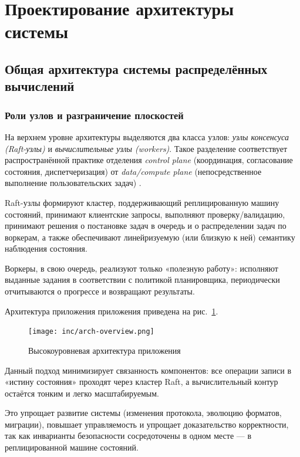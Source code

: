 \section{Проектирование архитектуры системы}

\subsection{Общая архитектура системы распределённых вычислений}

\subsubsection{Роли узлов и разграничение плоскостей}

На верхнем уровне архитектуры выделяются два класса узлов: \emph{узлы
консенсуса (Raft-узлы)} и \emph{вычислительные узлы (workers)}. Такое
разделение соответствует распространённой практике отделения \emph{control
plane} (координация, согласование состояния, диспетчеризация) от
\emph{data/compute plane} (непосредственное выполнение пользовательских задач)
\cite{coulouris2012}.

Raft-узлы формируют кластер, поддерживающий реплицированную машину состояний,
принимают клиентские запросы, выполняют проверку/валидацию, принимают решения о
постановке задач в очередь и о распределении задач по воркерам, а также
обеспечивают линейризуемую (или близкую к ней) семантику наблюдения состояния.

Воркеры, в свою очередь, реализуют только «полезную работу»: исполняют выданные
задания в соответствии с политикой планировщика, периодически отчитываются о
прогрессе и возвращают результаты.

Архитектура приложения приложения приведена на рис.~\ref{fig:arch-overview}.

\begin{figure}
  \centering
  \texttt{[image: inc/arch-overview.png]}
  \caption{Высокоуровневая архитектура приложения}
  \label{fig:arch-overview}
\end{figure}

Данный подход минимизирует связанность компонентов: все операции записи в
«истину состояния» проходят через кластер Raft, а вычислительный контур
остаётся тонким и легко масштабируемым.

Это упрощает развитие системы (изменения протокола, эволюцию форматов,
миграции), повышает управляемость и упрощает доказательство корректности, так
как инварианты безопасности сосредоточены в одном месте — в реплицированной
машине состояний.

